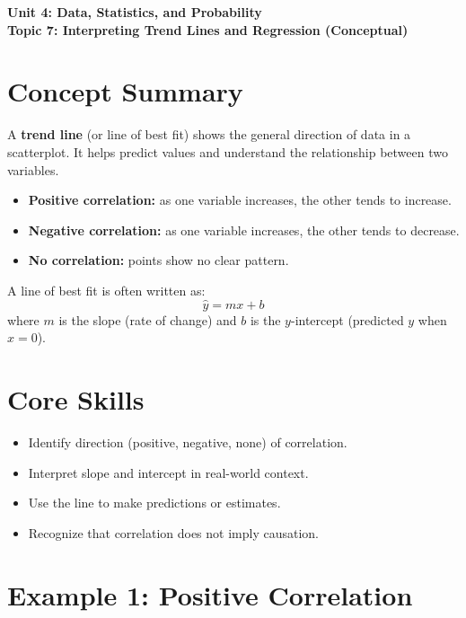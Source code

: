 \documentclass[12pt]{article}
\begin{document}
\begin{center}
    \LARGE \textbf{Unit 4: Data, Statistics, and Probability} \\[6pt]
    \Large \textbf{Topic 7: Interpreting Trend Lines and Regression (Conceptual)}
\end{center}

\vspace{1em}

\section*{Concept Summary}

A \textbf{trend line} (or line of best fit) shows the general direction of data in a scatterplot.  
It helps predict values and understand the relationship between two variables.

\begin{itemize}
  \item \textbf{Positive correlation:} as one variable increases, the other tends to increase.
  \item \textbf{Negative correlation:} as one variable increases, the other tends to decrease.
  \item \textbf{No correlation:} points show no clear pattern.
\end{itemize}

A line of best fit is often written as:
\[
\hat{y} = mx + b
\]
where \(m\) is the slope (rate of change) and \(b\) is the \(y\)-intercept (predicted \(y\) when \(x=0\)).

\section*{Core Skills}
\begin{itemize}
  \item Identify direction (positive, negative, none) of correlation.
  \item Interpret slope and intercept in real-world context.
  \item Use the line to make predictions or estimates.
  \item Recognize that correlation does not imply causation.
\end{itemize}

\section*{Example 1: Positive Correlation}
\end{document}
